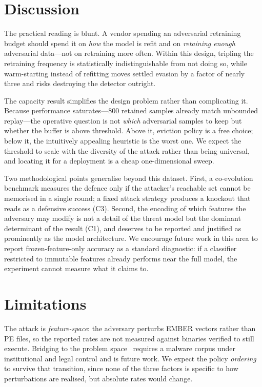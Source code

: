 \documentclass[conference]{IEEEtran}
\begin{document}
\section{Discussion}

The practical reading is blunt. A vendor spending an adversarial retraining
budget should spend it on \emph{how} the model is refit and on \emph{retaining
enough} adversarial data---not on retraining more often. Within this design,
tripling the retraining frequency is statistically indistinguishable from not
doing so, while warm-starting instead of refitting moves settled evasion by a
factor of nearly three and risks destroying the detector outright.

The capacity result simplifies the design problem rather than complicating it.
Because performance saturates---$800$ retained samples already match unbounded
replay---the operative question is not \emph{which} adversarial samples to keep
but whether the buffer is above threshold. Above it, eviction policy is a free
choice; below it, the intuitively appealing heuristic is the worst one. We
expect the threshold to scale with the diversity of the attack rather than
being universal, and locating it for a deployment is a cheap one-dimensional
sweep.

Two methodological points generalise beyond this dataset. First, a co-evolution
benchmark measures the defence only if the attacker's reachable set cannot be
memorised in a single round; a fixed attack strategy produces a knockout that
reads as a defensive success (C3). Second, the encoding of which features the
adversary may modify is not a detail of the threat model but the dominant
determinant of the result (C1), and deserves to be reported and justified as
prominently as the model architecture. We encourage future work in this area to
report frozen-feature-only accuracy as a standard diagnostic: if a classifier
restricted to immutable features already performs near the full model, the
experiment cannot measure what it claims to.

\section{Limitations}

The attack is \emph{feature-space}: the adversary perturbs EMBER vectors rather
than PE files, so the reported rates are not measured against binaries verified
to still execute. Bridging to the problem
space~\cite{pierazzi2020problemspace,tsingenopoulos2024raid} requires a malware
corpus under institutional and legal control and is future work. We expect the
policy \emph{ordering} to survive that transition, since none of the three
factors is specific to how perturbations are realised, but absolute rates would
change.
\end{document}
